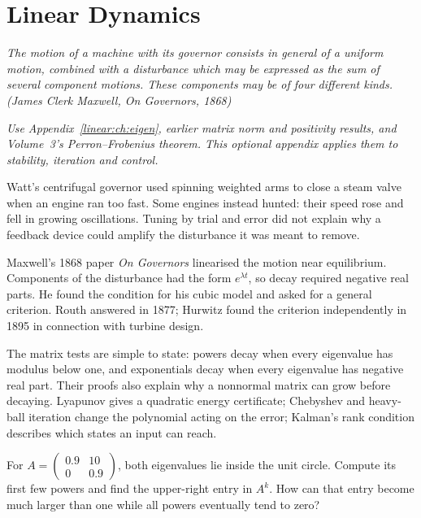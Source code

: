 \chapter{Linear Dynamics}\label{linear:ch:dynamics}

\begin{center}\itshape
The motion of a machine with its governor consists in general of a uniform motion, combined with a disturbance which may be
expressed as the sum of several component motions. These components may be of four different kinds.
\upshape(James Clerk Maxwell, \emph{On Governors}, 1868)
\end{center}
\noindent\emph{Use Appendix~\ref{linear:ch:eigen}, earlier matrix norm and positivity results, and Volume~3's Perron--Frobenius theorem. This optional appendix applies them to stability, iteration and control.}

Watt's centrifugal governor used spinning weighted arms to close a steam valve when an engine ran too fast. Some engines instead hunted: their speed rose and fell in growing oscillations. Tuning by trial and error did not explain why a feedback device could amplify the disturbance it was meant to remove.

Maxwell's 1868 paper \emph{On Governors} linearised the motion near equilibrium. Components of the disturbance had the form $e^{\lambda t}$, so decay required negative real parts. He found the condition for his cubic model and asked for a general criterion. Routh answered in 1877; Hurwitz found the criterion independently in 1895 in connection with turbine design.

The matrix tests are simple to state: powers decay when every eigenvalue has modulus below one, and exponentials decay when every eigenvalue has negative real part. Their proofs also explain why a nonnormal matrix can grow before decaying. Lyapunov gives a quadratic energy certificate; Chebyshev and heavy-ball iteration change the polynomial acting on the error; Kalman's rank condition describes which states an input can reach.

\begin{think}
For $A=\begin{pmatrix}0.9&10\\0&0.9\end{pmatrix}$, both eigenvalues lie inside the unit circle. Compute its first few powers and find the upper-right entry in $A^k$. How can that entry become much larger than one while all powers eventually tend to zero?
\end{think}

